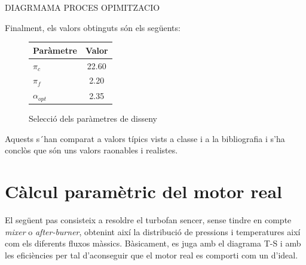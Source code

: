 DIAGRMAMA PROCES OPIMITZACIO

Finalment, els valors obtinguts són els següents:
\begin{figure}[H]
	\centering
	\begin{tabular}{lc}
		\toprule[3pt]
		\textbf{Paràmetre}&\textbf{Valor}\\
		\midrule[1pt]
		$\pi_{c}$ & 22.60 \\
		$\pi_{f}$ & 2.20 \\
		$\alpha_{opt}$ & 2.35 \\
		\bottomrule[2pt]
	\end{tabular}
	\label{C_opti2}
	\caption{Selecció dels paràmetres de disseny}
\end{figure}
Aquests s´han comparat a valors típics vists a classe i a la bibliografia i s'ha conclòs que són uns valors raonables i realistes.
\section{Càlcul paramètric del motor real}
El següent pas consisteix a resoldre el turbofan sencer, sense tindre en compte \textit{mixer} o \textit{after-burner}, obtenint així la distribució de pressions i temperatures així com els diferents fluxos màssics. Bàsicament, es juga amb el diagrama T-S i amb les eficiències per tal d'aconseguir que el motor real es comporti com un d'ideal.


